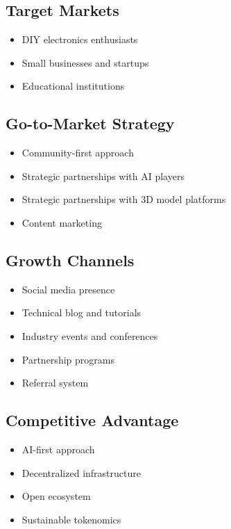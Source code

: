 \subsection{Target Markets}
\begin{itemize}[leftmargin=*]
    \item DIY electronics enthusiasts
    \item Small businesses and startups
    \item Educational institutions
\end{itemize}

\subsection{Go-to-Market Strategy}
\begin{itemize}[leftmargin=*]
    \item Community-first approach
    \item Strategic partnerships with AI players
    \item Strategic partnerships with 3D model platforms
    \item Content marketing
\end{itemize}

\subsection{Growth Channels}
\begin{itemize}[leftmargin=*]
    \item Social media presence
    \item Technical blog and tutorials
    \item Industry events and conferences
    \item Partnership programs
    \item Referral system
\end{itemize}

\subsection{Competitive Advantage}
\begin{itemize}[leftmargin=*]
    \item AI-first approach
    \item Decentralized infrastructure
    \item Open ecosystem
    \item Sustainable tokenomics
\end{itemize}

